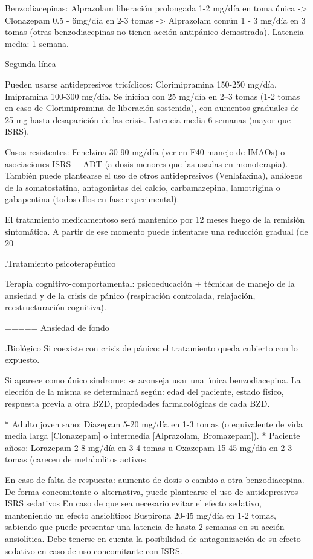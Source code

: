 \documentclass{scrbook}
\begin{document}
Benzodiacepinas: Alprazolam liberación prolongada 1-2 mg/día en toma única -> Clonazepam 0.5 - 6mg/día en 2-3 tomas -> Alprazolam común 1 - 3 mg/día en 3 tomas (otras benzodiacepinas no tienen acción antipánico demostrada). Latencia media: 1 semana.

Segunda línea

Pueden usarse antidepresivos tricíclicos: Clorimipramina 150-250 mg/día, Imipramina 100-300 mg/día. Se inician con 25 mg/día en 2--3 tomas (1-2 tomas en caso de Clorimipramina de liberación sostenida), con aumentos graduales de 25 mg hasta desaparición de las crisis. Latencia media 6 semanas (mayor que ISRS).

Casos resistentes: Fenelzina 30-90 mg/día (ver en F40 manejo de IMAOs) o asociaciones ISRS + ADT (a dosis menores que las usadas en monoterapia). También puede plantearse el uso de otros antidepresivos (Venlafaxina), análogos de la somatostatina, antagonistas del calcio, carbamazepina, lamotrigina o gabapentina (todos ellos en fase experimental).

El tratamiento medicamentoso será mantenido por 12 meses luego de la remisión sintomática. A partir de ese momento puede intentarse una reducción gradual (de 20%

.Tratamiento psicoterapéutico

Terapia cognitivo-comportamental: psicoeducación + técnicas de manejo de la ansiedad y de la crisis de pánico (respiración controlada, relajación, reestructuración cognitiva).

===== Ansiedad de fondo

.Biológico
Si coexiste con crisis de pánico: el tratamiento queda cubierto con lo expuesto.

Si aparece como único síndrome: se aconseja usar una única benzodiacepina. La elección de la misma se determinará según: edad del paciente, estado físico, respuesta previa a otra BZD, propiedades farmacológicas de cada BZD.

* Adulto joven sano: Diazepam 5-20 mg/día en 1-3 tomas (o equivalente de vida media larga [Clonazepam] o intermedia [Alprazolam, Bromazepam]).
* Paciente añoso: Lorazepam 2-8 mg/día en 3-4 tomas u Oxazepam 15-45 mg/día en 2-3 tomas (carecen de metabolitos activos

En caso de falta de respuesta: aumento de dosis o cambio a otra benzodiacepina. De forma concomitante o alternativa, puede plantearse el uso de antidepresivos ISRS sedativos En caso de que sea necesario evitar el efecto sedativo, manteniendo un efecto ansiolítico: Buspirona 20-45 mg/día en 1-2 tomas, sabiendo que puede presentar una latencia de hasta 2 semanas en su acción ansiolítica. Debe tenerse en cuenta la posibilidad de antagonización de su efecto sedativo en caso de uso concomitante con ISRS.
\end{document}
